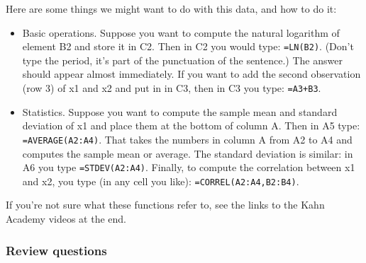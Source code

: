 \documentclass[letterpaper,12pt]{article}
\begin{document}
Here are some things we might want to do with this data,
and how to do it:
\begin{itemize}
\item Basic operations.  Suppose you want to compute the natural
logarithm of element B2 and store it in C2.
Then in C2 you would type:  {\tt =LN(B2)}.
(Don't type the period, it's part of the punctuation of the sentence.)
The answer should appear almost immediately.
If you want to add the second observation (row 3) of x1 and x2
and put in in C3, then in C3 you type:
{\tt =A3+B3}.

\item Statistics.
Suppose you want to compute the sample mean and standard deviation of
x1 and place them at the bottom of column A.
Then in A5 type: {\tt =AVERAGE(A2:A4)}.
That takes the numbers in column A from A2 to A4 and computes the sample
mean or average.
The standard deviation is similar:  in A6 you type {\tt =STDEV(A2:A4)}.
Finally, to compute the correlation between x1 and x2,
you type (in any cell you like):
{\tt =CORREL(A2:A4,B2:B4)}.

\end{itemize}
If you're not sure what these functions refer to,
see the links to the Kahn Academy videos at the end.

\subsubsection*{Review questions}
\end{document}
